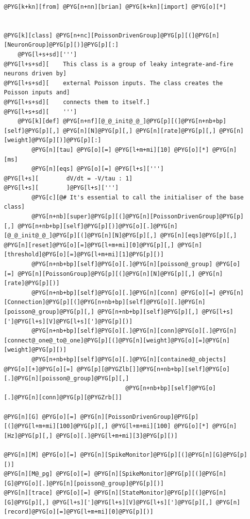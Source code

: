 \documentclass[letterpaper,10pt,english]{manual}
\begin{document}
\begin{Verbatim}[commandchars=@\[\]]
@PYG[k+kn][from] @PYG[n+nn][brian] @PYG[k+kn][import] @PYG[o][*]


@PYG[k][class] @PYG[n+nc][PoissonDrivenGroup]@PYG[p][(]@PYG[n][NeuronGroup]@PYG[p][)]@PYG[p][:]
    @PYG[l+s+sd][''']
@PYG[l+s+sd][    This class is a group of leaky integrate-and-fire neurons driven by]
@PYG[l+s+sd][    external Poisson inputs. The class creates the Poisson inputs and]
@PYG[l+s+sd][    connects them to itself.]
@PYG[l+s+sd][    ''']
    @PYG[k][def] @PYG[n+nf][@_@_init@_@_]@PYG[p][(]@PYG[n+nb+bp][self]@PYG[p][,] @PYG[n][N]@PYG[p][,] @PYG[n][rate]@PYG[p][,] @PYG[n][weight]@PYG[p][)]@PYG[p][:]
        @PYG[n][tau] @PYG[o][=] @PYG[l+m+mi][10] @PYG[o][*] @PYG[n][ms]
        @PYG[n][eqs] @PYG[o][=] @PYG[l+s][''']
@PYG[l+s][        dV/dt = -V/tau : 1]
@PYG[l+s][        ]@PYG[l+s][''']
        @PYG[c][@# It's essential to call the initialiser of the base class]
        @PYG[n+nb][super]@PYG[p][(]@PYG[n][PoissonDrivenGroup]@PYG[p][,] @PYG[n+nb+bp][self]@PYG[p][)]@PYG[o][.]@PYG[n][@_@_init@_@_]@PYG[p][(]@PYG[n][N]@PYG[p][,] @PYG[n][eqs]@PYG[p][,] @PYG[n][reset]@PYG[o][=]@PYG[l+m+mi][0]@PYG[p][,] @PYG[n][threshold]@PYG[o][=]@PYG[l+m+mi][1]@PYG[p][)]
        @PYG[n+nb+bp][self]@PYG[o][.]@PYG[n][poisson@_group] @PYG[o][=] @PYG[n][PoissonGroup]@PYG[p][(]@PYG[n][N]@PYG[p][,] @PYG[n][rate]@PYG[p][)]
        @PYG[n+nb+bp][self]@PYG[o][.]@PYG[n][conn] @PYG[o][=] @PYG[n][Connection]@PYG[p][(]@PYG[n+nb+bp][self]@PYG[o][.]@PYG[n][poisson@_group]@PYG[p][,] @PYG[n+nb+bp][self]@PYG[p][,] @PYG[l+s][']@PYG[l+s][V]@PYG[l+s][']@PYG[p][)]
        @PYG[n+nb+bp][self]@PYG[o][.]@PYG[n][conn]@PYG[o][.]@PYG[n][connect@_one@_to@_one]@PYG[p][(]@PYG[n][weight]@PYG[o][=]@PYG[n][weight]@PYG[p][)]
        @PYG[n+nb+bp][self]@PYG[o][.]@PYG[n][contained@_objects] @PYG[o][+]@PYG[o][=] @PYG[p][@PYGZlb[]]@PYG[n+nb+bp][self]@PYG[o][.]@PYG[n][poisson@_group]@PYG[p][,]
                                   @PYG[n+nb+bp][self]@PYG[o][.]@PYG[n][conn]@PYG[p][@PYGZrb[]]

@PYG[n][G] @PYG[o][=] @PYG[n][PoissonDrivenGroup]@PYG[p][(]@PYG[l+m+mi][100]@PYG[p][,] @PYG[l+m+mi][100] @PYG[o][*] @PYG[n][Hz]@PYG[p][,] @PYG[o][.]@PYG[l+m+mi][3]@PYG[p][)]

@PYG[n][M] @PYG[o][=] @PYG[n][SpikeMonitor]@PYG[p][(]@PYG[n][G]@PYG[p][)]
@PYG[n][M@_pg] @PYG[o][=] @PYG[n][SpikeMonitor]@PYG[p][(]@PYG[n][G]@PYG[o][.]@PYG[n][poisson@_group]@PYG[p][)]
@PYG[n][trace] @PYG[o][=] @PYG[n][StateMonitor]@PYG[p][(]@PYG[n][G]@PYG[p][,] @PYG[l+s][']@PYG[l+s][V]@PYG[l+s][']@PYG[p][,] @PYG[n][record]@PYG[o][=]@PYG[l+m+mi][0]@PYG[p][)]


\end{Verbatim}
\end{document}
